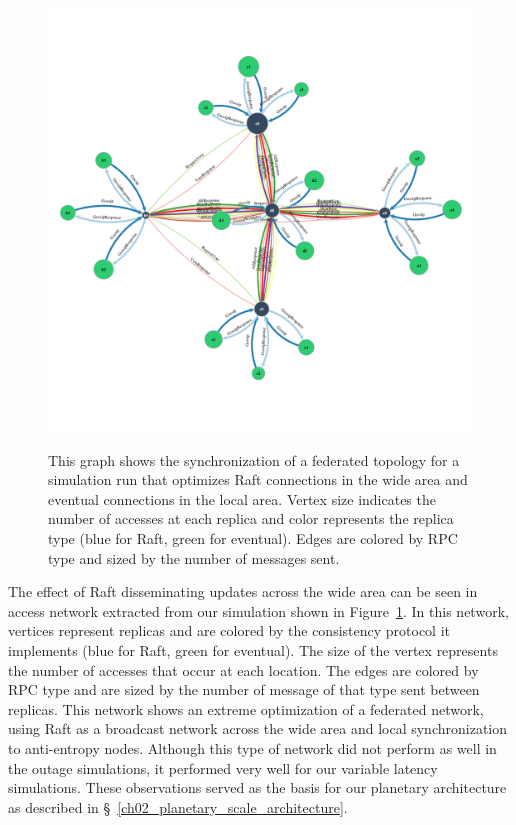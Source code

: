 \begin{figure}
    \begin{center}
        \includegraphics[width=5in]{figures/ch04_federated_sync.png}
    \end{center}
    \renewcommand{\baselinestretch}{1}
    \small\normalsize

    \begin{quote}
        \caption[Federated Syncronization Topology]{This graph shows the synchronization of a federated topology for a simulation run that optimizes Raft connections in the wide area and eventual connections in the local area. Vertex size indicates the number of accesses at each replica and color represents the replica type (blue for Raft, green for eventual). Edges are colored by RPC type and sized by the number of messages sent.}
        \label{fig:ch04_federated_sync}
    \end{quote}
\end{figure}
\renewcommand{\baselinestretch}{2}
\small\normalsize

The effect of Raft disseminating updates across the wide area can be seen in access network extracted from our simulation shown in Figure~\ref{fig:ch04_federated_sync}.
In this network, vertices represent replicas and are colored by the consistency protocol it implements (blue for Raft, green for eventual).
The size of the vertex represents the number of accesses that occur at each location.
The edges are colored by RPC type and are sized by the number of message of that type sent between replicas.
This network shows an extreme optimization of a federated network, using Raft as a broadcast network across the wide area and local synchronization to anti-entropy nodes.
Although this type of network did not perform as well in the outage simulations, it performed very well for our variable latency simulations.
These observations served as the basis for our planetary architecture as described in \S~\ref{ch02_planetary_scale_architecture}.

